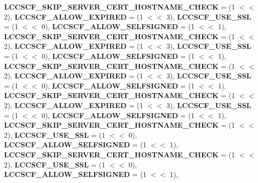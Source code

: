 \begin{DoxyCompactItemize}
{\bfseries L\+C\+C\+S\+C\+F\+\_\+\+S\+K\+I\+P\+\_\+\+S\+E\+R\+V\+E\+R\+\_\+\+C\+E\+R\+T\+\_\+\+H\+O\+S\+T\+N\+A\+M\+E\+\_\+\+C\+H\+E\+CK} = (1 $<$$<$ 2), 
{\bfseries L\+C\+C\+S\+C\+F\+\_\+\+A\+L\+L\+O\+W\+\_\+\+E\+X\+P\+I\+R\+ED} = (1 $<$$<$ 3), 
\newline
{\bfseries L\+C\+C\+S\+C\+F\+\_\+\+U\+S\+E\+\_\+\+S\+SL} = (1 $<$$<$ 0), 
{\bfseries L\+C\+C\+S\+C\+F\+\_\+\+A\+L\+L\+O\+W\+\_\+\+S\+E\+L\+F\+S\+I\+G\+N\+ED} = (1 $<$$<$ 1), 
{\bfseries L\+C\+C\+S\+C\+F\+\_\+\+S\+K\+I\+P\+\_\+\+S\+E\+R\+V\+E\+R\+\_\+\+C\+E\+R\+T\+\_\+\+H\+O\+S\+T\+N\+A\+M\+E\+\_\+\+C\+H\+E\+CK} = (1 $<$$<$ 2), 
{\bfseries L\+C\+C\+S\+C\+F\+\_\+\+A\+L\+L\+O\+W\+\_\+\+E\+X\+P\+I\+R\+ED} = (1 $<$$<$ 3), 
\newline
{\bfseries L\+C\+C\+S\+C\+F\+\_\+\+U\+S\+E\+\_\+\+S\+SL} = (1 $<$$<$ 0), 
{\bfseries L\+C\+C\+S\+C\+F\+\_\+\+A\+L\+L\+O\+W\+\_\+\+S\+E\+L\+F\+S\+I\+G\+N\+ED} = (1 $<$$<$ 1), 
{\bfseries L\+C\+C\+S\+C\+F\+\_\+\+S\+K\+I\+P\+\_\+\+S\+E\+R\+V\+E\+R\+\_\+\+C\+E\+R\+T\+\_\+\+H\+O\+S\+T\+N\+A\+M\+E\+\_\+\+C\+H\+E\+CK} = (1 $<$$<$ 2), 
{\bfseries L\+C\+C\+S\+C\+F\+\_\+\+A\+L\+L\+O\+W\+\_\+\+E\+X\+P\+I\+R\+ED} = (1 $<$$<$ 3), 
\newline
{\bfseries L\+C\+C\+S\+C\+F\+\_\+\+U\+S\+E\+\_\+\+S\+SL} = (1 $<$$<$ 0), 
{\bfseries L\+C\+C\+S\+C\+F\+\_\+\+A\+L\+L\+O\+W\+\_\+\+S\+E\+L\+F\+S\+I\+G\+N\+ED} = (1 $<$$<$ 1), 
{\bfseries L\+C\+C\+S\+C\+F\+\_\+\+S\+K\+I\+P\+\_\+\+S\+E\+R\+V\+E\+R\+\_\+\+C\+E\+R\+T\+\_\+\+H\+O\+S\+T\+N\+A\+M\+E\+\_\+\+C\+H\+E\+CK} = (1 $<$$<$ 2), 
{\bfseries L\+C\+C\+S\+C\+F\+\_\+\+A\+L\+L\+O\+W\+\_\+\+E\+X\+P\+I\+R\+ED} = (1 $<$$<$ 3), 
\newline
{\bfseries L\+C\+C\+S\+C\+F\+\_\+\+U\+S\+E\+\_\+\+S\+SL} = (1 $<$$<$ 0), 
{\bfseries L\+C\+C\+S\+C\+F\+\_\+\+A\+L\+L\+O\+W\+\_\+\+S\+E\+L\+F\+S\+I\+G\+N\+ED} = (1 $<$$<$ 1), 
{\bfseries L\+C\+C\+S\+C\+F\+\_\+\+S\+K\+I\+P\+\_\+\+S\+E\+R\+V\+E\+R\+\_\+\+C\+E\+R\+T\+\_\+\+H\+O\+S\+T\+N\+A\+M\+E\+\_\+\+C\+H\+E\+CK} = (1 $<$$<$ 2), 
{\bfseries L\+C\+C\+S\+C\+F\+\_\+\+U\+S\+E\+\_\+\+S\+SL} = (1 $<$$<$ 0), 
\newline
{\bfseries L\+C\+C\+S\+C\+F\+\_\+\+A\+L\+L\+O\+W\+\_\+\+S\+E\+L\+F\+S\+I\+G\+N\+ED} = (1 $<$$<$ 1), 
{\bfseries L\+C\+C\+S\+C\+F\+\_\+\+S\+K\+I\+P\+\_\+\+S\+E\+R\+V\+E\+R\+\_\+\+C\+E\+R\+T\+\_\+\+H\+O\+S\+T\+N\+A\+M\+E\+\_\+\+C\+H\+E\+CK} = (1 $<$$<$ 2), 
{\bfseries L\+C\+C\+S\+C\+F\+\_\+\+U\+S\+E\+\_\+\+S\+SL} = (1 $<$$<$ 0), 
{\bfseries L\+C\+C\+S\+C\+F\+\_\+\+A\+L\+L\+O\+W\+\_\+\+S\+E\+L\+F\+S\+I\+G\+N\+ED} = (1 $<$$<$ 1), 
\newline

\end{DoxyCompactItemize}
